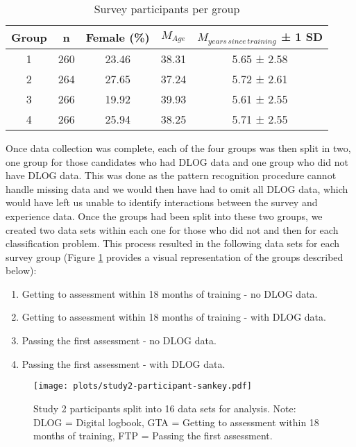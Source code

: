 \documentclass[
  12pt,
  a4paper,
]{book}
\providecommand{\tightlist}{%
  \setlength{\itemsep}{0pt}\setlength{\parskip}{0pt}}
\begin{document}
\begin{table}

\caption{\label{tab:survey-dev-participants}Survey participants per group}
\centering
\begin{tabular}[t]{ccccc}
\toprule
Group & n & Female (\%) & $M_{Age}$ & $M_{years\,since\,training}$ ± 1 SD\\
\midrule
1 & 260 & 23.46 & 38.31 & 5.65 ± 2.58\\
2 & 264 & 27.65 & 37.24 & 5.72 ± 2.61\\
3 & 266 & 19.92 & 39.93 & 5.61 ± 2.55\\
4 & 266 & 25.94 & 38.25 & 5.71 ± 2.55\\
\bottomrule
\end{tabular}
\end{table}

Once data collection was complete, each of the four groups was then split in two, one group for those candidates who had DLOG data and one group who did not have DLOG data. This was done as the pattern recognition procedure cannot handle missing data and we would then have had to omit all DLOG data, which would have left us unable to identify interactions between the survey and experience data. Once the groups had been split into these two groups, we created two data sets within each one for those who did not and then for each classification problem. This process resulted in the following data sets for each survey group (Figure \ref{fig:study2-participant-sankey} provides a visual representation of the groups described below):

\begin{enumerate}
\def\labelenumi{\arabic{enumi})}
\tightlist
\item
  Getting to assessment within 18 months of training - no DLOG data.
\item
  Getting to assessment within 18 months of training - with DLOG data.
\item
  Passing the first assessment - no DLOG data.
\item
  Passing the first assessment - with DLOG data.
\end{enumerate}

\begin{figure}
\centering
\texttt{[image: plots/study2-participant-sankey.pdf]}
\caption{\label{fig:study2-participant-sankey}Study 2 participants split into 16 data sets for analysis. Note: DLOG = Digital logbook, GTA = Getting to assessment within 18 months of training, FTP = Passing the first assessment.}
\end{figure}
\end{document}
